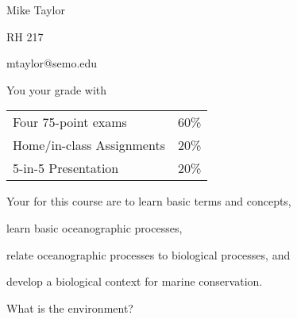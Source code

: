 \documentclass[t]{beamer}
\begin{document}

{
\begin{frame}[t]
\end{frame}
}

{
\begin{frame}[t,plain]
\large
\vspace{5ex}
\hangpara\hspace{17em} Mike Taylor

\hangpara\hspace{17em} RH 217

\hangpara\hspace{17em} mtaylor@semo.edu

\end{frame}
}

\begin{frame}[t]{You  your grade with}
	\begin{center}\large\begin{tabular}{@{}ll@{}}
	Four 75-point exams & 60\% \\
	Home/in-class Assignments & 20\% \\
	5-in-5 Presentation & 20\% \\
	\end{tabular}
	\end{center}
\end{frame}

{
\begin{frame}[t]
\end{frame}
}

\begin{frame}[t]{Your  for this course are to}
	\hangpara learn basic terms and concepts,

	\hangpara learn basic oceanographic processes,
	
	\hangpara relate oceanographic processes to biological processes, and

	\hangpara develop a biological context for marine conservation.
	
	\pause
	
	\hangpara {}

\end{frame}

{
\begin{frame}[t]{What is the  environment?}
\end{frame}
}
\end{document}
